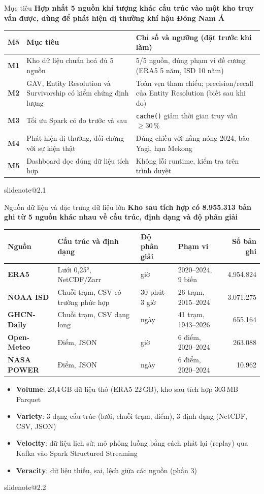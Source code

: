 \documentclass[t,aspectratio=169,12pt]{beamer}
\makeatletter
\newcommand{\slidenote}[1]{\ifcsname slidenote@#1\endcsname\note{\csname slidenote@#1\endcsname}\fi}
\newcommand{\ychinh}[1]{\vskip1mm{\bfseries #1}\par\vskip1mm}
\makeatother
\begin{document}
\begin{frame}{Mục tiêu}
  \ychinh{Hợp nhất 5 nguồn khí tượng khác cấu trúc vào một kho truy vấn được, dùng để phát hiện dị thường khí hậu Đông Nam Á}
  \footnotesize
  \begin{tabular}{@{}>{\leavevmode\bfseries\color{hustblue}}p{0.8cm}p{5.4cm}p{7.6cm}@{}}
    \toprule
    \color{black}Mã & Mục tiêu & Chỉ số và ngưỡng (đặt trước khi làm) \\
    \midrule
    M1 & Kho dữ liệu chuẩn hoá đủ 5 nguồn & 5/5 nguồn, đúng phạm vi đề cương (ERA5 5 năm, ISD 10 năm) \\
    M2 & GAV, Entity Resolution và Survivorship có kiểm chứng định lượng & Toàn vẹn tham chiếu; precision/recall của Entity Resolution (biết sau khi đo) \\
    M3 & Tối ưu Spark có đo trước và sau & \texttt{cache()} giảm thời gian truy vấn $\geq 30\,\%$ \\
    M4 & Phát hiện dị thường, đối chứng với sự kiện thật & Đúng chiều với nắng nóng 2024, bão Yagi, hạn Mekong \\
    M5 & Dashboard đọc đúng dữ liệu tích hợp & Không lỗi runtime, kiểm tra trên trình duyệt \\
    \bottomrule
  \end{tabular}
  \slidenote{2.1}
\end{frame}
\begin{frame}{Nguồn dữ liệu và đặc trưng dữ liệu lớn}
  \ychinh{Kho sau tích hợp có 8.955.313 bản ghi từ 5 nguồn khác nhau về cấu trúc, định dạng và độ phân giải}
  \centering\scriptsize
  \renewcommand{\arraystretch}{0.95}
  \begin{tabular}{@{}>{\bfseries}llllr@{}}
    \toprule
    Nguồn & Cấu trúc và định dạng & Độ phân giải & Phạm vi & Số bản ghi \\
    \midrule
    ERA5 & Lưới 0,25°, NetCDF/Zarr & giờ & 2020--2024, 9 biến & 4.954.824 \\
    NOAA ISD & Chuỗi trạm, CSV có trường phức hợp & 30 phút--3 giờ & 26 trạm, 2015--2024 & 3.071.275 \\
    GHCN-Daily & Chuỗi trạm, CSV dạng long & ngày & 41 trạm, 1943--2026 & 655.164 \\
    Open-Meteo & Điểm, JSON & giờ & 6 điểm, 2020--2024 & 263.088 \\
    NASA POWER & Điểm, JSON & ngày & 6 điểm, 2020--2024 & 10.962 \\
    \bottomrule
  \end{tabular}
  \raggedright
  \begin{itemize}\footnotesize\setlength\itemsep{0.3mm}
    \item \textbf{Volume}: 23,4\,GB dữ liệu thô (ERA5 22\,GB), kho sau tích hợp 303\,MB Parquet
    \item \textbf{Variety}: 3 dạng cấu trúc (lưới, chuỗi trạm, điểm), 3 định dạng (NetCDF, CSV, JSON)
    \item \textbf{Velocity}: dữ liệu lịch sử; mô phỏng luồng bằng cách phát lại (replay) qua Kafka vào Spark Structured Streaming
    \item \textbf{Veracity}: dữ liệu thiếu, sai, lệch giữa các nguồn (phần 3)
  \end{itemize}
  \slidenote{2.2}
\end{frame}
\end{document}
